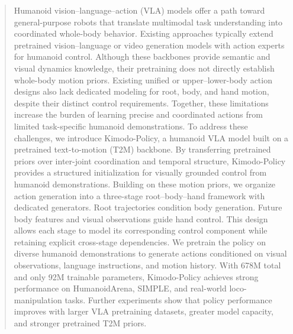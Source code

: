 \begin{abstract}
  Humanoid vision--language--action (VLA) models offer a path toward general-purpose robots that translate multimodal task understanding into coordinated whole-body behavior.
  Existing approaches typically extend pretrained vision--language or video generation models with action experts for humanoid control.
  Although these backbones provide semantic and visual dynamics knowledge, their pretraining does not directly establish whole-body motion priors. Existing unified or upper--lower-body action designs also lack dedicated modeling for root, body, and hand motion, despite their distinct control requirements.
  Together, these limitations increase the burden of learning precise and coordinated actions from limited task-specific humanoid demonstrations.
  To address these challenges, we introduce Kimodo-Policy, a humanoid VLA model built on a pretrained text-to-motion (T2M) backbone. By transferring pretrained priors over inter-joint coordination and temporal structure, Kimodo-Policy provides a structured initialization for visually grounded control from humanoid demonstrations. Building on these motion priors, we organize action generation into a three-stage root–body–hand framework with dedicated generators. Root trajectories condition body generation. Future body features and visual observations guide hand control. This design allows each stage to model its corresponding control component while retaining explicit cross-stage dependencies.
  We pretrain the policy on diverse humanoid demonstrations to generate actions conditioned on visual observations, language instructions, and motion history. With 678M total and only 92M trainable parameters, Kimodo-Policy achieves strong performance on HumanoidArena, SIMPLE, and real-world loco-manipulation tasks. Further experiments show that policy performance improves with larger VLA pretraining datasets, greater model capacity, and stronger pretrained T2M priors.
\end{abstract}
